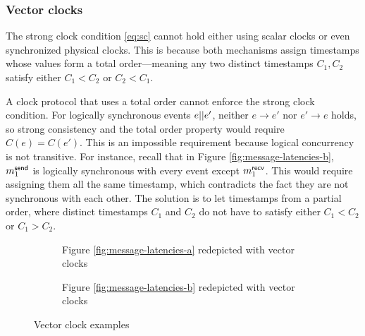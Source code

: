 \documentclass[]             %
{NASA}                       %
\theoremstyle{definition}
\begin{document}
\subsubsection{Vector clocks}
\label{sssec:vector-clocks}
The strong clock condition \eqref{eq:sc} cannot hold either using
scalar clocks or even synchronized physical clocks. This is because
both mechanisms assign timestamps whose values form a total order---meaning any
two distinct timestamps $C_1, C_2$ satisfy either $C_1 < C_2$ or $C_2 < C_1$.

A clock protocol that uses a total order cannot enforce the strong
clock condition. For logically synchronous events $e || e'$,
neither $e \to e'$ nor $e' \to e$ holds, so strong consistency and the
total order property would require $C(e) = C(e')$. This is an
impossible requirement because logical concurrency is not
transitive. For instance, recall that in Figure
\ref{fig:message-latencies-b}, $m_{1}^{\mathsf{send}}$ is logically synchronous
with every event except $m_{1}^{\mathsf{recv}}$. This would require assigning them
all the same timestamp, which contradicts the fact they are not
synchronous with each other. The solution is to let timestamps from a
partial order, where distinct timestamps $C_1$ and $C_2$ do not have
to satisfy either $C_1 < C_2$ or $C_1 > C_2$.

\begin{figure}
  \setlength\belowcaptionskip{5ex}

  \begin{subfigure}{1\textwidth}
    \centering
    
    \caption{Figure \ref{fig:message-latencies-a} redepicted with vector clocks}
    \label{fig:message-latencies-vector-a}
  \end{subfigure}

  \vspace{4ex}

  \begin{subfigure}{1\textwidth}
    \centering 
    \caption{Figure \ref{fig:message-latencies-b} redepicted with vector clocks}
    \label{fig:message-latencies-vector-b}
  \end{subfigure}

  \caption{Vector clock examples}
  \label{fig:message-latencies-vector}
\end{figure}
\afterpage{\clearpage}
\end{document}
